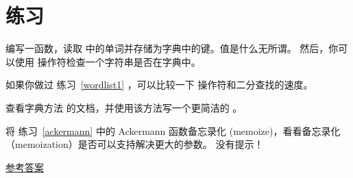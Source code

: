 


\section{练习}

\begin{exercise}
\label{wordlist2}

  


编写一函数，读取  中的单词并存储为字典中的键。值是什么无所谓。
然后，你可以使用  操作符检查一个字符串是否在字典中。

如果你做过 练习~\ref{wordlist1} ，可以比较一下  操作符和二分查找的速度。

\end{exercise}


\begin{exercise}
\label{setdefault}


查看字典方法  的文档，并使用该方法写一个更简洁的 。

  

\end{exercise}


\begin{exercise}

将 练习~\ref{ackermann} 中的 Ackermann 函数备忘录化 (memoize)，看看备忘录化（memoization）是否可以支持解决更大的参数。 没有提示！

\href{http://thinkpython2.com/code/ackermann_memo.py}{参考答案}
  

\end{exercise}

